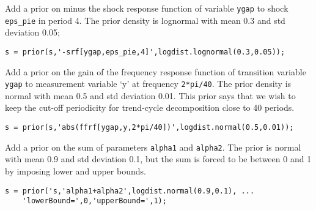 Add a prior on minus the shock response function of variable
\texttt{ygap} to shock \texttt{eps\_pie} in period 4. The prior density
is lognormal with mean 0.3 and std deviation 0.05;

\begin{verbatim}
s = prior(s,'-srf[ygap,eps_pie,4]',logdist.lognormal(0.3,0.05));
\end{verbatim}

Add a prior on the gain of the frequency response function of transition
variable \texttt{ygap} to measurement variable `y' at frequency
\texttt{2*pi/40}. The prior density is normal with mean 0.5 and std
deviation 0.01. This prior says that we wish to keep the cut-off
periodicity for trend-cycle decomposition close to 40 periods.

\begin{verbatim}
s = prior(s,'abs(ffrf[ygap,y,2*pi/40])',logdist.normal(0.5,0.01));
\end{verbatim}

Add a prior on the sum of parameters \texttt{alpha1} and
\texttt{alpha2}. The prior is normal with mean 0.9 and std deviation
0.1, but the sum is forced to be between 0 and 1 by imposing lower and
upper bounds.

\begin{verbatim}
s = prior('s,'alpha1+alpha2',logdist.normal(0.9,0.1), ...
    'lowerBound=',0,'upperBound=',1);
\end{verbatim}


